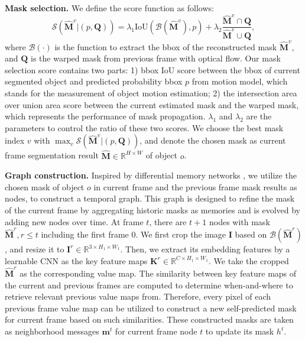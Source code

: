 \documentclass[letterpaper]{article} %
\begin{document}
\noindent \textbf{Mask selection.}
We define the score function as follows:
\begin{equation}
    \mathcal{S}(\widehat{\bm{M}}^{v}|(p,\bm{Q})) = \lambda_1 \text{IoU}(\mathcal{B}(\widehat{\bm{M}}^{v}), p) + \lambda_2 \frac{\widehat{\bm{M}}^{v} \cap \bm{Q}}{\widehat{\bm{M}}^{v} \cup \bm{Q}},
\label{eq:lambda}
\end{equation}
where $\mathcal{B}(\cdot)$ is the function to extract the bbox of the reconstructed mask $\widehat{\bm{M}}^{v}$, and $\bm{Q}$ is the warped mask from previous frame with optical flow. Our mask selection score contains two parts: 1) bbox IoU score between the bbox of current segmented object and predicted probability bbox $p$ from motion model, which stands for the measurement of object motion estimation; 2) the intersection area over union area score between the current estimated mask and the warped mask, which represents the performance of mask propagation. $\lambda_1$ and $\lambda_2$ are the parameters to control the ratio of these two scores. We choose the best mask index $v$ with $\max_{v} \mathcal{S}(\widehat{\bm{M}}^{v}|(p,\bm{Q}))$, and denote the chosen mask as current frame segmentation result $\widehat{\bm{M}} \in \mathbb{R}^{H\times W}$ of object $o$.

\noindent \textbf{Graph construction.}
Inspired by differential memory networks \cite{vaswani2017attention,sukhbaatar2015end}, we utilize the chosen mask of object $o$ in current frame and the previous frame mask results as nodes, to construct a temporal graph. This graph is designed to refine the mask of the current frame by aggregating historic masks as memories and is evolved by adding new nodes over time. At frame $t$, there are $t+1$ nodes with mask $\widehat{\bm{M}}^r,r\leq t$ including the first frame $0$. 
We first crop the image $\bm{I}$ based on $\mathcal{B}(\widehat{\bm{M}}^r)$, and resize it to $\bm{I}^r \in \mathbb{R}^{3 \times H_1 \times W_1}$. Then, we
extract its embedding features by a learnable CNN as the key feature maps $\bm{K}^r \in \mathbb{R}^{C \times H_1 \times W_1}$. We take the cropped $\widehat{\bm{M}}^r$ as the corresponding value map. 
The similarity between key feature maps of the current and previous frames are computed to determine when-and-where to retrieve relevant previous value maps from. Therefore, every pixel of each previous frame value map can be utilized to construct a new self-predicted mask for current frame based on such similarities. These constructed masks are taken as neighborhood messages $\bm{m}^t$ for current frame node $t$ to update its mask $h^t$. 
\end{document}
